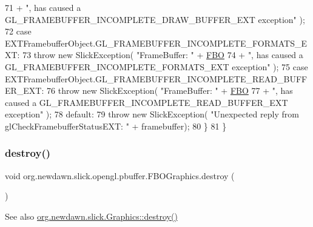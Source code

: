 \begin{DoxyCode}
71                         + \textcolor{stringliteral}{", has caused a GL\_FRAMEBUFFER\_INCOMPLETE\_DRAW\_BUFFER\_EXT exception"} );
72             \textcolor{keywordflow}{case} EXTFramebufferObject.GL\_FRAMEBUFFER\_INCOMPLETE\_FORMATS\_EXT:
73                 \textcolor{keywordflow}{throw} \textcolor{keyword}{new} SlickException( \textcolor{stringliteral}{"FrameBuffer: "} + \mbox{\hyperlink{classorg_1_1newdawn_1_1slick_1_1opengl_1_1pbuffer_1_1_f_b_o_graphics_a94baa0295ca9f8d804b98c49be9abc8a}{FBO}}
74                         + \textcolor{stringliteral}{", has caused a GL\_FRAMEBUFFER\_INCOMPLETE\_FORMATS\_EXT exception"} );
75             \textcolor{keywordflow}{case} EXTFramebufferObject.GL\_FRAMEBUFFER\_INCOMPLETE\_READ\_BUFFER\_EXT:
76                 \textcolor{keywordflow}{throw} \textcolor{keyword}{new} SlickException( \textcolor{stringliteral}{"FrameBuffer: "} + \mbox{\hyperlink{classorg_1_1newdawn_1_1slick_1_1opengl_1_1pbuffer_1_1_f_b_o_graphics_a94baa0295ca9f8d804b98c49be9abc8a}{FBO}}
77                         + \textcolor{stringliteral}{", has caused a GL\_FRAMEBUFFER\_INCOMPLETE\_READ\_BUFFER\_EXT exception"} );
78             \textcolor{keywordflow}{default}:
79                 \textcolor{keywordflow}{throw} \textcolor{keyword}{new} SlickException( \textcolor{stringliteral}{"Unexpected reply from glCheckFramebufferStatusEXT: "} + 
      framebuffer);
80         \}
81     \}
\end{DoxyCode}
\mbox{\label{classorg_1_1newdawn_1_1slick_1_1opengl_1_1pbuffer_1_1_f_b_o_graphics_a135d6b68519bec4c5a30fcd71ef66644}} 
\subsubsection{\texorpdfstring{destroy()}{destroy()}}
{\footnotesize\ttfamily void org.\+newdawn.\+slick.\+opengl.\+pbuffer.\+F\+B\+O\+Graphics.\+destroy (\begin{DoxyParamCaption}{ }\end{DoxyParamCaption})\hspace{0.3cm}{\ttfamily [inline]}}

\begin{DoxySeeAlso}{See also}
\mbox{\hyperlink{classorg_1_1newdawn_1_1slick_1_1_graphics_a44477025ba5a47f93552fa1f5cd15480}{org.\+newdawn.\+slick.\+Graphics\+::destroy()}} 
\end{DoxySeeAlso}

